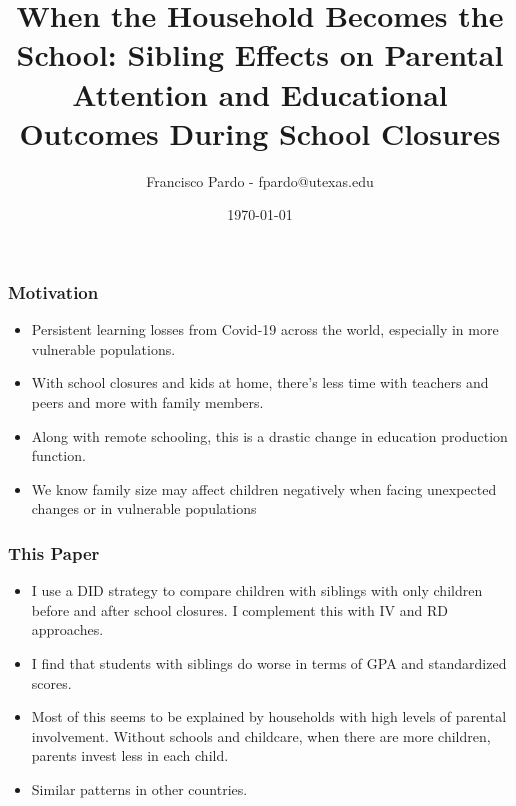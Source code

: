 \documentclass{beamer}
\title[]{When the Household Becomes the School: Sibling Effects on Parental Attention and Educational Outcomes During School Closures}
\author[Francisco Pardo] %
{Francisco Pardo - fpardo@utexas.edu \inst{1}}
\institute[UT] %
{
  \inst{1}%
  University of Texas at Austin
}
\date{\today}
\begin{document}
\frame{\titlepage}


\begin{frame}[t]
    \label{frame:motivation}
    \frametitle{Motivation}

    
    \begin{itemize}
        \item Persistent learning losses from Covid-19 across the world, especially in more vulnerable populations. %
        \item With school closures and kids at home, there's less time with teachers and peers and more with family members.
        \item Along with remote schooling, this is a drastic change in education production function.
        \item We know family size may affect children negatively when facing unexpected changes or in vulnerable populations
        
    \end{itemize}
    
\end{frame}





\begin{frame}
    \label{frame:thispaper}
    \frametitle{This Paper}
    \begin{itemize}
    \item I use a DID strategy to compare children with siblings with only children before and after school closures. I complement this with IV and RD approaches.
    \item I find that students with siblings do  worse in terms of GPA and standardized scores. 
    \item Most of this seems to be explained by households with high levels of parental involvement. Without schools and childcare, when there are more children, parents invest less in each child.
    \item Similar patterns in other countries.
    \end{itemize}
\end{frame}
\end{document}
